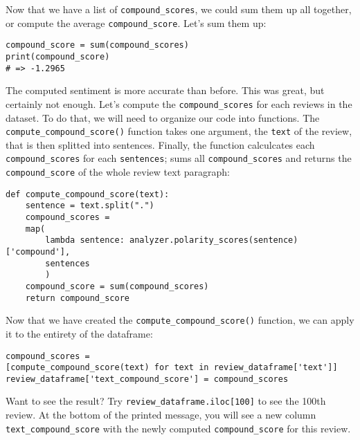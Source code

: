	Now that we have a list of \verb|compound_scores|, we could sum them up all together, or compute the average \verb|compound_score|. Let's sum them up:
	\begin{Verbatim}
compound_score = sum(compound_scores)
print(compound_score)
# => -1.2965
	\end{Verbatim}
	The computed sentiment is more accurate than before. This was great, but certainly not enough. Let's compute the \verb|compound_scores| for each reviews in the dataset. To do that, we will need to organize our code into functions. The \verb|compute_compound_score()| function takes one argument, the \verb|text| of the review, that is then splitted into sentences. Finally, the function calculcates each \verb|compound_scores| for each \verb|sentences|; sums all \verb|compound_scores| and returns the \verb|compound_score| of the whole review text paragraph:
	\begin{Verbatim}
def compute_compound_score(text):
	sentence = text.split(".")
	compound_scores = 
	map(
		lambda sentence: analyzer.polarity_scores(sentence)['compound'], 
		sentences
		)
	compound_score = sum(compound_scores)
	return compound_score
	\end{Verbatim}
	Now that we have created the \verb|compute_compound_score()| function, we can apply it to the entirety of the dataframe:
	\begin{Verbatim}
compound_scores = 
[compute_compound_score(text) for text in review_dataframe['text']]
review_dataframe['text_compound_score'] = compound_scores
	\end{Verbatim}
	Want to see the result? Try \verb|review_dataframe.iloc[100]| to see the 100th review. At the bottom of the printed message, you will see a new column \verb|text_compound_score| with the newly computed \verb|compound_score| for this review.
	

